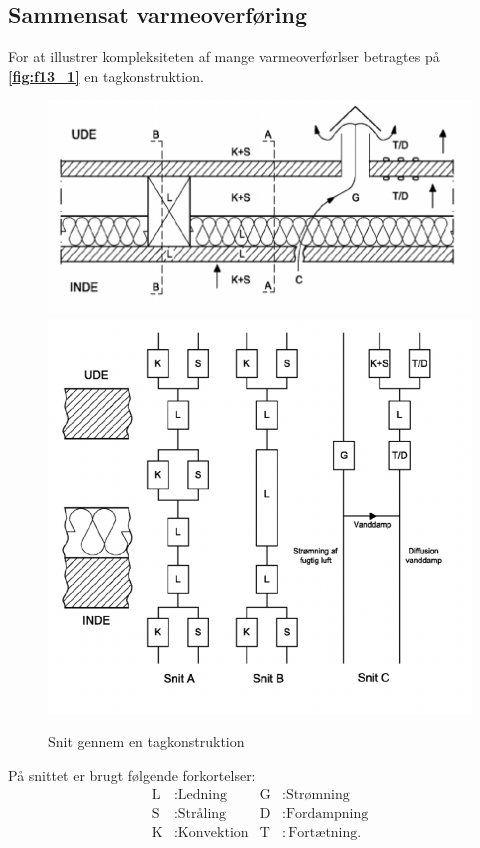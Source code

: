 \subsection{Sammensat varmeoverføring}
For at illustrer kompleksiteten af mange varmeoverførlser betragtes på \textbf{\autoref{fig:f13_1}} en tagkonstruktion. 
\begin{figure} [ht]
  \centering
  \includegraphics[width=0.5\linewidth]{./figures/f13_1.png}
  \includegraphics[width=0.4\linewidth]{./figures/f13_1_1.png}
  \caption{Snit gennem en tagkonstruktion}
  \label{fig:f13_1}
\end{figure}
På snittet er brugt følgende forkortelser:
\begin{align*}
  \text{L}&: \text{Ledning} & \text{G}&: \text{Strømning} \\
  \text{S}&: \text{Stråling} & \text{D}&: \text{Fordampning} \\
  \text{K}&: \text{Konvektion} & \text{T}&: \text{Fortætning}
.\end{align*}

